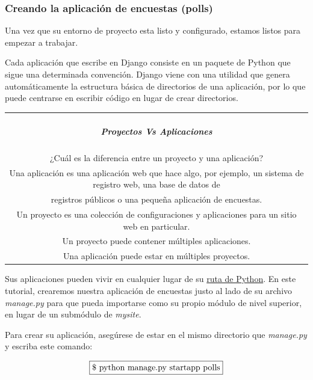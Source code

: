 \documentclass[10pt]{article}
\newcommand{\py}[1]{{\textcolor{B}{Python} #1}}
\newcommand{\django}[1]{{\textcolor{G}{Django} #1}}
\begin{document}
\subsubsection{Creando la aplicación de encuestas (polls)}
Una vez que su entorno de proyecto esta listo y configurado, estamos listos para empezar a trabajar.


Cada aplicación que escribe en \django{} consiste en un paquete de \py{} que sigue una determinada convención. \django{} viene con una utilidad que genera automáticamente la estructura básica de directorios de una aplicación, por lo que puede centrarse en escribir código en lugar de crear directorios.

\begin{table}[H]
	\begin{tabular}{||c||}
	\hline \\
	\begin{Large}
	\textbf{\textit{Proyectos Vs Aplicaciones}}
	\end{Large}
	\\\\		
¿Cuál es la diferencia entre un proyecto y una aplicación?\\ Una aplicación es una aplicación web que hace algo, por ejemplo, un sistema de registro web, una base de datos de\\ registros públicos o una pequeña aplicación de encuestas.\\ Un proyecto es una colección de configuraciones y aplicaciones para un sitio web en particular. \\Un proyecto puede contener múltiples aplicaciones.\\ Una aplicación puede estar en múltiples proyectos.
\\ \hline 	
			\end{tabular}
		\end{table}		

Sus aplicaciones pueden vivir en cualquier lugar de su
{\textcolor{B}{\href{https://docs.python.org/3/tutorial/modules.htm}{ruta de Python}}}. En este tutorial, crearemos nuestra aplicación de encuestas justo al lado de su archivo \textit{manage.py} para que pueda importarse como su propio módulo de nivel superior, en lugar de un submódulo de \textit{mysite}.

Para crear su aplicación, asegúrese de estar en el mismo directorio que \textit{manage.py} y escriba este comando:

$$\fbox{\$ python manage.py startapp polls}$$
\end{document}
